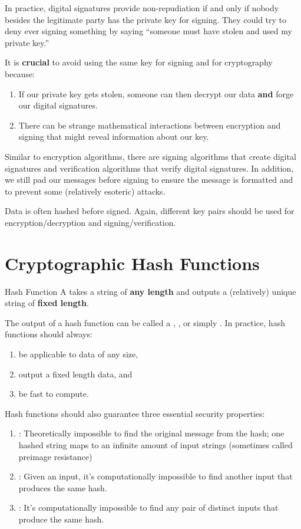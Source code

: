 \documentclass[code]{amznotes}
\begin{document}
In practice, digital signatures provide non-repudiation if and only if nobody besides the legitimate party has the private key for signing. They could try to deny ever signing something by saying ``someone must have stolen and used my private key.''

It is \textbf{crucial} to avoid using the same key for signing and for cryptography because:
\begin{enumerate}[noitemsep]
    \item If our private key gets stolen, someone can then decrypt our data \textbf{and} forge our digital signatures.
    \item There can be strange mathematical interactions between encryption and signing that might reveal information about our key.
\end{enumerate}

Similar to encryption algorithms, there are signing algorithms that create digital signatures and verification algorithms that verify digital signatures. In addition, we still pad our messages before signing to ensure the message is formatted and to prevent some (relatively esoteric) attacks.

Data is often hashed before signed. Again, different key pairs should be used for encryption/decryption and signing/verification.

\section{Cryptographic Hash Functions}

\begin{dfnbox}{Hash Function}{}
    A  takes a string of \textbf{any length} and outputs a (relatively) unique string of \textbf{fixed length}.
\end{dfnbox}

The output of a hash function can be called a , , or simply . In practice, hash functions should always:
\begin{enumerate}[noitemsep]
    \item be applicable to data of any size,
    \item output a fixed length data, and
    \item be fast to compute.
\end{enumerate}

Hash functions should also guarantee three essential security properties:
\begin{enumerate}[noitemsep]
    \item {}: Theoretically impossible to find the original message from the hash; one hashed string maps to an infinite amount of input strings (sometimes called preimage resistance)
    \item {}: Given an input, it's computationally impossible to find another input that produces the same hash.
    \item {}: It's computationally impossible to find any pair of distinct inputs that produce the same hash.
\end{enumerate}
\end{document}
